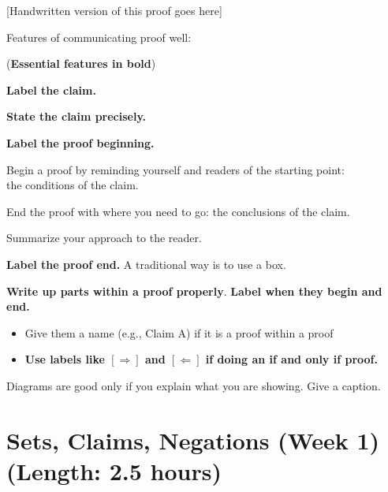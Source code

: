 \documentclass[11pt]{article}
\theoremstyle{definition}
\begin{document}
\begin{mdframed}{}
[Handwritten version of this proof goes here]
\end{mdframed}


\begin{minipage}{5.5in}
\begin{mdframed}\raggedright\parskip2pt
Features of communicating proof well:

({\bf Essential features in bold})

\begin{enumerate*}
\item {\bf Label the claim.}
\item {\bf State the claim precisely.}
\item {\bf Label the proof beginning.}
\item Begin a proof by reminding yourself and readers of the starting point:\\ the conditions of the claim.
\item End the proof with where you need to go: the conclusions of the claim.
\item Summarize your approach to the reader. 
\item {\bf Label the proof end.} A traditional way is to use a box.
\item {\bf Write up parts within a proof properly}. {\bf Label when they begin and end.}
	\begin{itemize} 
	\item Give them a name (e.g., Claim A) if it is a proof within a proof
	\item {\bf Use labels like $[\Rightarrow]$ and $[\Leftarrow]$ if doing an if and only if proof.}
	\end{itemize}

\item Diagrams are good only if you explain what you are showing. Give a caption.
\end{enumerate*}
\end{mdframed}
\end{minipage}

\section{Sets, Claims, Negations (Week 1) (Length: 2.5 hours)}  %
\label{s: sets}
\end{document}
